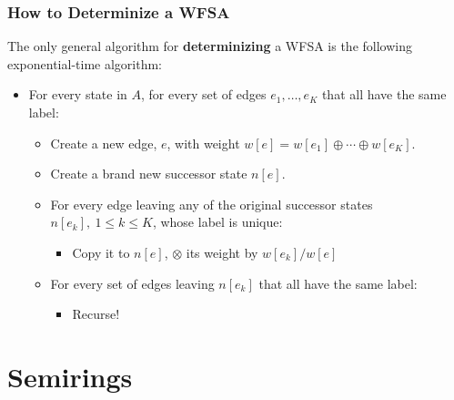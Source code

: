 \documentclass{beamer}
\begin{document}
\begin{frame}
  \frametitle{How to Determinize a WFSA}

  The only general algorithm for {\bf determinizing} a WFSA is the
  following exponential-time algorithm:
  \begin{itemize}
  \item For every state in $A$, for every set of edges
    $e_1,\ldots,e_K$ that all have the same label:
    \begin{itemize}
    \item Create a new edge, $e$, with weight $w[e]=w[e_1]\oplus\cdots\oplus w[e_K]$.
    \item Create a brand new successor state $n[e]$.
    \item For every edge leaving any of the original successor states
      $n[e_k],~1\le k\le K$, whose label is unique:
      \begin{itemize}
      \item Copy  it to $n[e]$, $\otimes$ its weight by $w[e_k]/w[e]$
      \end{itemize}
    \item For every set of edges leaving $n[e_k]$ that all have the
      same label:
      \begin{itemize}
      \item Recurse!
      \end{itemize}
    \end{itemize}
  \end{itemize}
\end{frame}

\section[Semirings]{Semirings}
\setcounter{subsection}{1}
\end{document}
